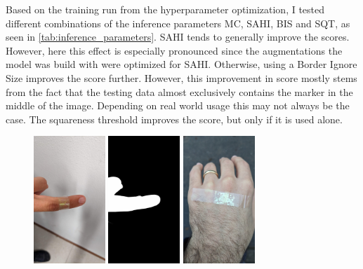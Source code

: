 \documentclass[10pt]{book}
\begin{document}
Based on the training run from the hyperparameter optimization, I tested different combinations of the inference parameters \ac{MC}, \ac{SAHI}, \ac{BIS} and \ac{SQT}, as seen in \autoref{tab:inference_parameters}. \ac{SAHI} tends to generally improve the scores. However, here this effect is especially pronounced since the augmentations the model was build with were optimized for \ac{SAHI}. Otherwise, using a Border Ignore Size improves the score further. However, this improvement in score mostly stems from the fact that the testing data almost exclusively contains the marker in the middle of the image. Depending on real world usage this may not always be the case. The squareness threshold improves the score, but only if it is used alone. 

\begin{figure}
  \centering
     {\includegraphics[width=0.24\textwidth]{image/foreground_mask_example_finger}}
     {\includegraphics[width=0.24\textwidth]{image/foreground_mask_example_finger_mask}}
     {\includegraphics[width=0.24\textwidth]{image/foreground_mask_example_hand}}

\end{figure}
\end{document}
